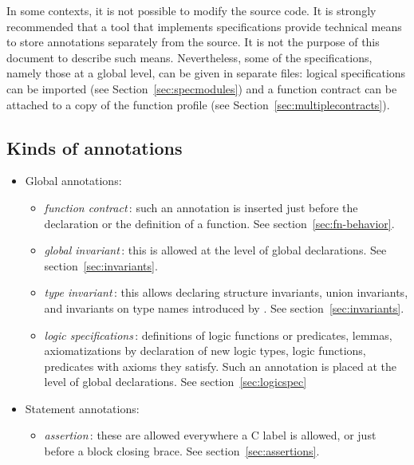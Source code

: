 In some contexts, it is not possible to modify the source code.
It is strongly recommended that a tool that implements
\NAME specifications provide technical means to store annotations
separately from the source. It is not the purpose of this document
to describe such means.  Nevertheless, some of the specifications,
namely those at a global level, can be given in separate files:
logical specifications can be imported (see
Section~\ref{sec:specmodules}) and a function contract can be attached
to a copy of the function profile (see
Section~\ref{sec:multiplecontracts}).

\subsection{Kinds of annotations}

\begin{itemize}
\item Global annotations:
  \begin{itemize}
  \item \emph{function contract}\,: such an annotation is inserted just before
    the declaration or the definition of a function.
    See section~\ref{sec:fn-behavior}.

  \item \emph{global invariant}\,: this is allowed at the level of
    global declarations. See section~\ref{sec:invariants}.

  \item \emph{type invariant}\,: this allows declaring  structure invariants,
     union invariants, 
     and invariants on type names introduced by
    \typedef.  See section~\ref{sec:invariants}.

  \item \emph{logic specifications}\,: definitions of logic functions
    or predicates, lemmas, axiomatizations by declaration of new logic
    types, logic functions, predicates with axioms they satisfy. Such an
    annotation is placed at the level of global declarations. 
    See section~\ref{sec:logicspec}

  \end{itemize}

\item Statement annotations:
  \begin{itemize}
  \item \emph{assertion}\,: these are allowed
    everywhere a C label is allowed, or just before a
    block closing brace. See section~\ref{sec:assertions}.


\end{itemize}
\end{itemize}
